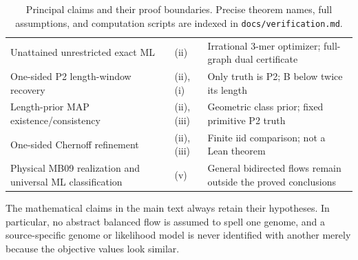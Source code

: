 \begin{table}[htbp]
\begin{tabular}{@{}p{}p{}p{}@{}}
Unattained unrestricted exact ML & (ii) & Irrational 3-mer optimizer; full-graph dual certificate \\
One-sided P2 length-window recovery & (ii), (i) & Only truth is P2; B below twice its length \\
Length-prior MAP existence/consistency & (ii), (iii) & Geometric class prior; fixed primitive P2 truth \\
One-sided Chernoff refinement & (ii), (iii) & Finite iid comparison; not a Lean theorem \\
Physical MB09 realization and universal ML classification & (v) & General bidirected flows remain outside the proved conclusions \\
\bottomrule
\end{tabular}
\caption{Principal claims and their proof boundaries. Precise theorem names,
full assumptions, and computation scripts are indexed in
\texttt{docs/verification.md}.}
\label{tab:ledger}
\end{table}

The mathematical claims in the main text always retain their hypotheses.
In particular, no abstract balanced flow is assumed to spell one genome,
and a source-specific genome or likelihood model is never identified with
another merely because the objective values look similar.
